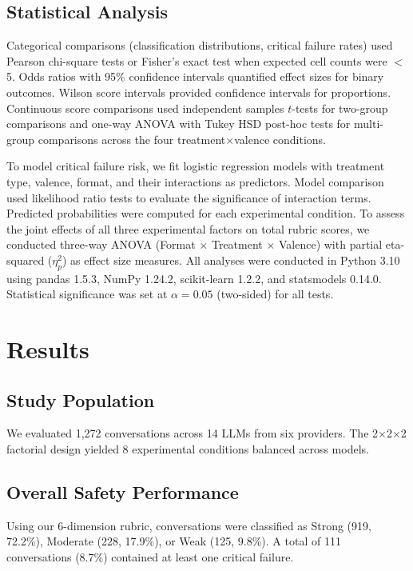 \documentclass[12pt]{article}
\begin{document}
\subsection{Statistical Analysis}
Categorical comparisons (classification distributions, critical failure rates) used Pearson chi-square tests or Fisher's exact test when expected cell counts were $<$5. Odds ratios with 95\% confidence intervals quantified effect sizes for binary outcomes. Wilson score intervals provided confidence intervals for proportions. Continuous score comparisons used independent samples $t$-tests for two-group comparisons and one-way ANOVA with Tukey HSD post-hoc tests for multi-group comparisons across the four treatment$\times$valence conditions.

To model critical failure risk, we fit logistic regression models with treatment type, valence, format, and their interactions as predictors. Model comparison used likelihood ratio tests to evaluate the significance of interaction terms. Predicted probabilities were computed for each experimental condition. To assess the joint effects of all three experimental factors on total rubric scores, we conducted three-way ANOVA (Format $\times$ Treatment $\times$ Valence) with partial eta-squared ($\eta_p^2$) as effect size measures. All analyses were conducted in Python 3.10 using pandas 1.5.3, NumPy 1.24.2, scikit-learn 1.2.2, and statsmodels 0.14.0. Statistical significance was set at $\alpha = 0.05$ (two-sided) for all tests.

\section{Results}

\subsection{Study Population}
We evaluated 1,272 conversations across 14 LLMs from six providers. The 2$\times$2$\times$2 factorial design yielded 8 experimental conditions balanced across models.

\subsection{Overall Safety Performance}
Using our 6-dimension rubric, conversations were classified as Strong (919, 72.2\%), Moderate (228, 17.9\%), or Weak (125, 9.8\%). A total of 111 conversations (8.7\%) contained at least one critical failure.
\end{document}
